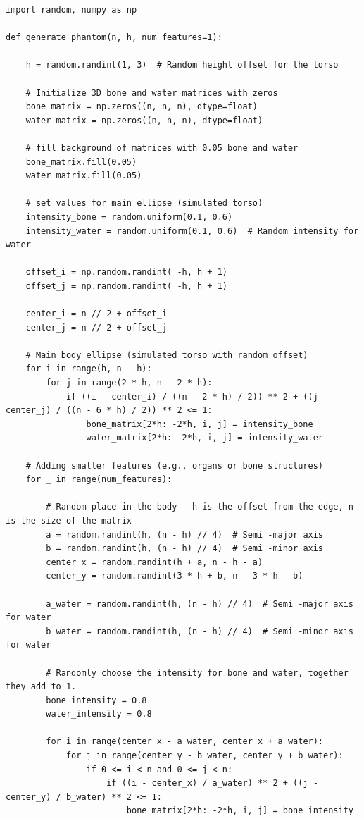 \begin{verbatim}
import random, numpy as np

def generate_phantom(n, h, num_features=1):

    h = random.randint(1, 3)  # Random height offset for the torso

    # Initialize 3D bone and water matrices with zeros
    bone_matrix = np.zeros((n, n, n), dtype=float)
    water_matrix = np.zeros((n, n, n), dtype=float)

    # fill background of matrices with 0.05 bone and water 
    bone_matrix.fill(0.05)
    water_matrix.fill(0.05)
    
    # set values for main ellipse (simulated torso)
    intensity_bone = random.uniform(0.1, 0.6)
    intensity_water = random.uniform(0.1, 0.6)  # Random intensity for water
    
    offset_i = np.random.randint( -h, h + 1)
    offset_j = np.random.randint( -h, h + 1)

    center_i = n // 2 + offset_i
    center_j = n // 2 + offset_j

    # Main body ellipse (simulated torso with random offset)
    for i in range(h, n - h):
        for j in range(2 * h, n - 2 * h):
            if ((i - center_i) / ((n - 2 * h) / 2)) ** 2 + ((j - center_j) / ((n - 6 * h) / 2)) ** 2 <= 1:
                bone_matrix[2*h: -2*h, i, j] = intensity_bone
                water_matrix[2*h: -2*h, i, j] = intensity_water

    # Adding smaller features (e.g., organs or bone structures)
    for _ in range(num_features):
        
        # Random place in the body - h is the offset from the edge, n is the size of the matrix
        a = random.randint(h, (n - h) // 4)  # Semi -major axis
        b = random.randint(h, (n - h) // 4)  # Semi -minor axis
        center_x = random.randint(h + a, n - h - a)
        center_y = random.randint(3 * h + b, n - 3 * h - b)

        a_water = random.randint(h, (n - h) // 4)  # Semi -major axis for water
        b_water = random.randint(h, (n - h) // 4)  # Semi -minor axis for water

        # Randomly choose the intensity for bone and water, together they add to 1. 
        bone_intensity = 0.8
        water_intensity = 0.8
        
        for i in range(center_x - a_water, center_x + a_water):
            for j in range(center_y - b_water, center_y + b_water):
                if 0 <= i < n and 0 <= j < n:
                    if ((i - center_x) / a_water) ** 2 + ((j - center_y) / b_water) ** 2 <= 1:
                        bone_matrix[2*h: -2*h, i, j] = bone_intensity


\end{verbatim}
